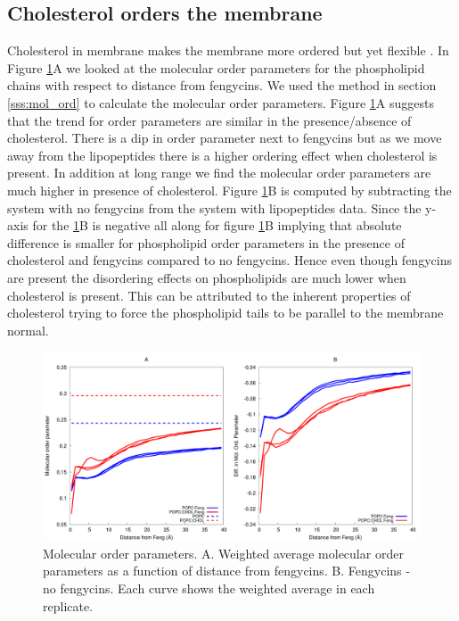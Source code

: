 \subsection{Cholesterol orders the membrane}
Cholesterol in membrane makes the membrane more ordered but yet flexible \cite{Barenholz2002}.
In Figure \ref{f:dibmop_1d}A we looked at the molecular order parameters for the 
phospholipid chains with respect to distance from fengycins. We used the method in 
section \ref{sss:mol_ord} to calculate the molecular order parameters.
Figure \ref{f:dibmop_1d}A suggests that the trend for order parameters are similar in 
the presence/absence of cholesterol. There is a dip in order parameter next to 
fengycins but as we move away from the lipopeptides there is a higher ordering effect 
when cholesterol is present. In addition at long range we find the molecular order 
parameters are much higher in presence of cholesterol. Figure \ref{f:dibmop_1d}B is 
computed by subtracting the system with no fengycins from the system with 
lipopeptides data. Since the y-axis for the \ref{f:dibmop_1d}B is negative all along for 
figure \ref{f:dibmop_1d}B implying that absolute difference is smaller for phospholipid 
order parameters in the presence of cholesterol and fengycins compared 
to no fengycins. Hence even though fengycins are present the disordering effects on phospholipids are much lower when cholesterol is present. This can be attributed 
to the inherent properties of cholesterol trying to force the phospholipid tails 
to be parallel to the membrane normal.
\begin{figure}[h!]
\centering
\includegraphics[width=4.5in,angle=0,keepaspectratio]{chapter3_figs/dibmop_avg_1d.pdf}
\caption{Molecular order parameters. A. Weighted average molecular order parameters as a function of distance from fengycins. B. Fengycins - no fengycins. Each curve shows the weighted average in each 
replicate. }
\label{f:dibmop_1d}
\end{figure}
